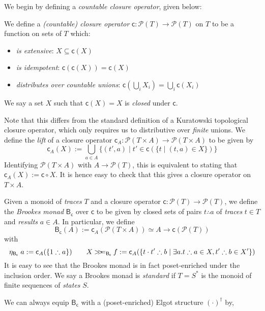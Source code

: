\documentclass[acmsmall,screen,review]{acmart}
\newcommand{\mc}[1]{\ensuremath{\mathcal{#1}}}
\newcommand{\ms}[1]{\ensuremath{\mathsf{#1}}}
\newcommand{\obind}{\mathbin{>\!\!>\mkern-6.7mu=}}
\newcommand{\mbind}[3]{#2 \obind_{#1} #3}
\newcommand{\tret}[2]{#1 \therefore #2}
\begin{document}
We begin by defining a \emph{countable closure operator}, given below:
\begin{definition}
  We define a \emph{(countable) closure operator} $\ms{c}: \mc{P}(T) \to \mc{P}(T)$ on $T$ to be a
  function on sets of $T$ which:
  \begin{itemize}
    \item \emph{is extensive}: $X \subseteq \ms{c}(X)$
    \item \emph{is idempotent}: $\ms{c}(\ms{c}(X)) = \ms{c}(X)$
    \item \emph{distributes over countable unions}: $\ms{c}(\bigcup_i X_i) = \bigcup_i \ms{c}(X_i)$
  \end{itemize}
  We say a set $X$ such that $\ms{c}(X) = X$ is \emph{closed} under $\ms{c}$. 
\end{definition}
Note that this differs from the standard definition of a Kuratowski topological closure operator,
which only requires us to distributive over \emph{finite} unions. We define the \emph{lift} of a
closure operator $\ms{c}_A : \mc{P}(T \times A) \to \mc{P}(T \times A)$ to be given by
\begin{equation*}
  \ms{c}_A(X) := \bigcup_{a \in A}\{(t', a) \mid t' \in \ms{c}(\{t \mid (t, a) \in X\})\}
\end{equation*}
Identifying $\mc{P}(T \times A)$ with $A \to \mc{P}(T)$, this is equivalent to stating that
$\ms{c}_A(X) := \ms{c} \circ X$. It is hence easy to check that this gives a closure operator on $T
\times A$.
\begin{definition}
  Given a monoid of \emph{traces} $T$ and a closure operator $\ms{c}: \mc{P}(T) \to \mc{P}(T)$, we
  define the \emph{Brookes monad} $\ms{B}_{\ms{c}}$ over $\ms{c}$ to be given by closed sets of
  pairs $\tret{t}{a}$ of \emph{traces} $t \in T$ and \emph{results} $a \in A$. In particular, we
  define
  $$
  \ms{B}_{\ms{c}}(A) := \ms{c}_A(\mc{P}(T \times A)) \simeq A \to \ms{c}(\mc{P}(T))
  $$
  with
  $$
  \eta_{\ms{B}_{\ms{c}}}\;a := \ms{c}_A(\{\tret{1}{a}\}) \qquad
  \mbind{\ms{B}_{\ms{c}}}{X}{f} 
  := \ms{c}_A(\{\tret{t \cdot t'}{b} \mid \exists a . \tret{t}{a} \in X, \tret{t'}{b} \in X'\})
  $$
  It is easy to see that the Brookes monad is in fact poset-enriched under the inclusion order. We
  say a Brookes monad is \emph{standard} if $T = S^*$ is the monoid of finite sequences of
  \emph{states} $S$.
\end{definition}
We can always equip $\ms{B}_{\ms{c}}$ with a (poset-enriched) Elgot structure $(\cdot)^\dagger$ by,
\end{document}
